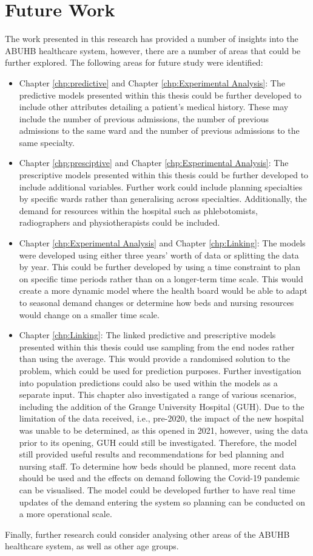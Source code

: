 \documentclass[../thesis.tex]{subfiles}
\begin{document}
\section{Future Work}
The work presented in this research has provided a number of insights into the ABUHB healthcare system, however, there are a number of areas that could be further explored. The following areas for future study were identified:
\begin{itemize}
    \item Chapter \ref{chp:predictive} and Chapter \ref{chp:Experimental Analysis}: The predictive models presented within this thesis could be further developed to include other attributes detailing a patient's medical history. These may include the number of previous admissions, the number of previous admissions to the same ward and the number of previous admissions to the same specialty.
    \item Chapter \ref{chp:presciptive} and Chapter \ref{chp:Experimental Analysis}: The prescriptive models presented within this thesis could be further developed to include additional variables. Further work could include planning specialties by specific wards rather than generalising across specialties. Additionally, the demand for resources within the hospital such as phlebotomists, radiographers and physiotherapists could be included. 
    \item Chapter \ref{chp:Experimental Analysis} and Chapter \ref{chp:Linking}: The models were developed using either three years' worth of data or splitting the data by year. This could be further developed by using a time constraint to plan on specific time periods rather than on a longer-term time scale. This would create a more dynamic model where the health board would be able to adapt to seasonal demand changes or determine how beds and nursing resources would change on a smaller time scale.
    \item Chapter \ref{chp:Linking}: The linked predictive and prescriptive models presented within this thesis could use sampling from the end nodes rather than using the average. This would provide a randomised solution to the problem, which could be used for prediction purposes. Further investigation into population predictions could also be used within the models as a separate input. This chapter also investigated a range of various scenarios, including the addition of the Grange University Hospital (GUH). Due to the limitation of the data received, i.e., pre-2020, the impact of the new hospital was unable to be determined, as this opened in 2021, however, using the data prior to its opening, GUH could still be investigated. Therefore, the model still provided useful results and recommendations for bed planning and nursing staff. To determine how beds should be planned, more recent data should be used and the effects on demand following the Covid-19 pandemic can be visualised. The model could be developed further to have real time updates of the demand entering the system so planning can be conducted on a more operational scale.
 
\end{itemize}

Finally, further research could consider analysing other areas of the ABUHB healthcare system, as well as other age groups.
\end{document}
